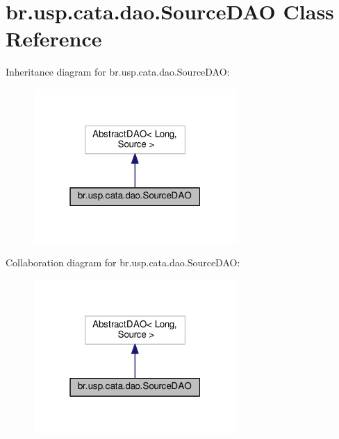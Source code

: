 \hypertarget{classbr_1_1usp_1_1cata_1_1dao_1_1_source_d_a_o}{\section{br.\+usp.\+cata.\+dao.\+Source\+D\+A\+O Class Reference}
\label{classbr_1_1usp_1_1cata_1_1dao_1_1_source_d_a_o}
}


Inheritance diagram for br.\+usp.\+cata.\+dao.\+Source\+D\+A\+O\+:\nopagebreak
\begin{figure}[H]
\begin{center}
\leavevmode
\includegraphics[width=220pt]{classbr_1_1usp_1_1cata_1_1dao_1_1_source_d_a_o__inherit__graph}
\end{center}
\end{figure}


Collaboration diagram for br.\+usp.\+cata.\+dao.\+Source\+D\+A\+O\+:\nopagebreak
\begin{figure}[H]
\begin{center}
\leavevmode
\includegraphics[width=220pt]{classbr_1_1usp_1_1cata_1_1dao_1_1_source_d_a_o__coll__graph}
\end{center}
\end{figure}
